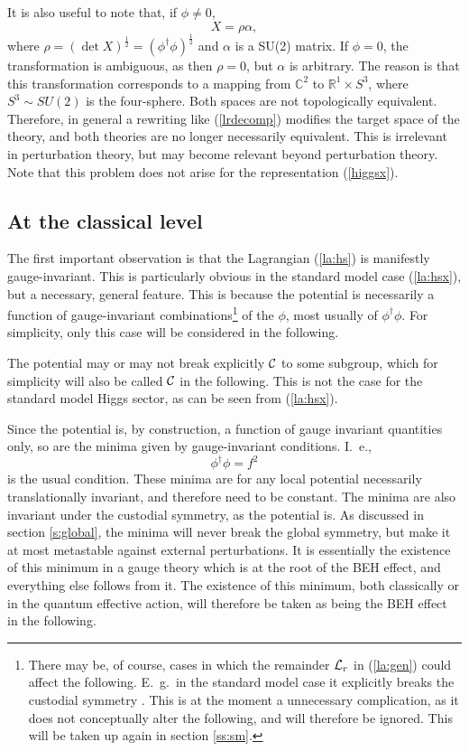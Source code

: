 \documentclass[final,12pt,3p,longtitle]{elsarticle}
\newcommand*{\La}{{\cal{L}}}
\newcommand*{\no}{\noindent}
\newcommand*{\be}{\begin{equation}}
\newcommand*{\ee}{\end{equation}}
\newcommand*{\pref}[1]{(\ref{#1})}
\newcommand*{\1}{1\!\!\!\bot}
\newcommand*{\rn}{\mathbb{R}}
\newcommand*{\cn}{\mathbb{C}}
\begin{document}
It is also useful to note that, if $\phi\neq 0$,
\be
X=\rho\alpha\label{lrdecomp},
\ee
\no where $\rho=(\det X)^\frac{1}{2}=(\phi^\dagger\phi)^\frac{1}{2}$ and $\alpha$ is a SU(2) matrix. If $\phi=0$, the transformation is ambiguous, as then $\rho=0$, but $\alpha$ is arbitrary. The reason is that this transformation corresponds to a mapping from $\cn^2$ to $\rn^1\times S^3$, where $S^3\sim SU(2)$ is the four-sphere. Both spaces are not topologically equivalent. Therefore, in general a rewriting like \pref{lrdecomp} modifies the target space of the theory, and both theories are no longer necessarily equivalent. This is irrelevant in perturbation theory, but may become relevant beyond perturbation theory. Note that this problem does not arise for the representation \pref{higgsx}.

\subsection{At the classical level}\label{ss:morse}

The first important observation is that the Lagrangian \pref{la:hs} is manifestly gauge-invariant. This is particularly obvious in the standard model case \pref{la:hsx}, but a necessary, general feature. This is because the potential is necessarily a function of gauge-invariant combinations\footnote{There may be, of course, cases in which the remainder $\La_r$ in \pref{la:gen} could affect the following. E.\ g.\ in the standard model case it explicitly breaks the custodial symmetry \cite{Bohm:2001yx}. This is at the moment a unnecessary complication, as it does not conceptually alter the following, and will therefore be ignored. This will be taken up again in section \ref{ss:sm}.} of the $\phi$, most usually of $\phi^\dagger\phi$. For simplicity, only this case will be considered in the following.

The potential may or may not break explicitly ${\cal C}$ to some subgroup, which for simplicity will also be called ${\cal C}$ in the following. This is not the case for the standard model Higgs sector, as can be seen from \pref{la:hsx}.

Since the potential is, by construction, a function of gauge invariant quantities only, so are the minima given by gauge-invariant conditions. I.\ e.,
\be
\phi^\dagger\phi=f^2\label{minhpot}
\ee
\no is the usual condition. These minima are for any local potential necessarily translationally invariant, and therefore need to be constant. The minima are also invariant under the custodial symmetry, as the potential is. As discussed in section \ref{s:global}, the minima will never break the global symmetry, but make it at most metastable against external perturbations. It is essentially the existence of this minimum in a gauge theory which is at the root of the BEH effect, and everything else follows from it. The existence of this minimum, both classically or in the quantum effective action, will therefore be taken as being the BEH effect in the following.
\end{document}
